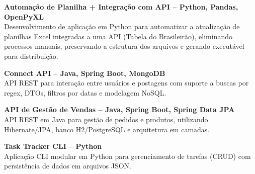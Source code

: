 \documentclass[a4paper,10pt]{article}
\begin{document}
\textbf{Automação de Planilha + Integração com API -- Python, Pandas, OpenPyXL} \\
Desenvolvimento de aplicação em Python para automatizar a atualização de planilhas Excel integradas a uma API (Tabela do Brasileirão), eliminando processos manuais, preservando a estrutura dos arquivos e gerando executável para distribuição.

\textbf{Connect API – Java, Spring Boot, MongoDB} \\
API REST para interação entre usuários e postagens com suporte a buscas por regex, DTOs, filtros por datas e modelagem NoSQL.

\textbf{API de Gestão de Vendas – Java, Spring Boot, Spring Data JPA} \\
API REST em Java para gestão de pedidos e produtos, utilizando Hibernate/JPA, banco H2/PostgreSQL e arquitetura em camadas.

\textbf{Task Tracker CLI – Python} \\
Aplicação CLI modular em Python para gerenciamento de tarefas (CRUD) com persistência de dados em arquivos JSON.
\end{document}
